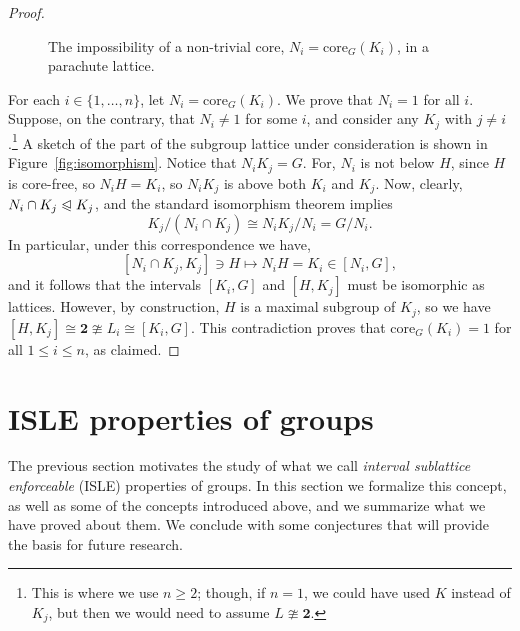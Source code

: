 \documentclass[cm,dissertation]{uhthesis}
\theoremstyle{plain}
\theoremstyle{definition}
\newcounter{claim}
\newcounter{conjecture}
\theoremstyle{remark}
\numberwithin{theorem}{section}
\numberwithin{claim}{chapter}
\numberwithin{equation}{section}
\numberwithin{conjecture}{chapter}
\newcommand{\<}{\ensuremath{\langle}}
\renewcommand{\>}{\ensuremath{\rangle}}
\renewcommand{\leq}{\ensuremath{\leqslant}}
\renewcommand{\geq}{\ensuremath{\geqslant}}
\newcommand{\subnormal}{\ensuremath{\trianglelefteqslant}}
\newcommand{\core}{\ensuremath{\mathrm{core}}}
\newcommand{\0}{\ensuremath{\mathbf{0}}}
\newcommand{\1}{\ensuremath{\mathbf{1}}}
\newcommand{\2}{\ensuremath{\mathbf{2}}}
\newcommand{\3}{\ensuremath{\mathbf{3}}}
\newcommand{\4}{\ensuremath{\mathbf{4}}}
\newcommand{\5}{\ensuremath{\mathbf{5}}}
\newcommand{\ISLE}{{\small ISLE}}
\newcommand{\two}{\ensuremath{\mathbf{2}}}
\begin{document}
\begin{proof}
\begin{figure}[!h]
\caption{The impossibility of a non-trivial core, $N_i = \core_G(K_i)$, in a parachute lattice.}
\end{figure}

For each $i\in\{1, \dots, n\}$, let $N_i = \core_G(K_i)$.  We prove that
$N_i=1$ for all $i$.  Suppose, on the contrary, that $N_i \neq 1$ for some
$i$, and consider any $K_j$ with $j\neq i$.\footnote{This is where we use $n\geq
  2$; though, if $n=1$, we could have used $K$ instead of $K_j$, but then we
  would need to assume $L\ncong \two$.}
A sketch of the part of the subgroup lattice under consideration is shown in
Figure~\ref{fig:isomorphism}. 
Notice that $N_i K_j = G$. For, $N_i$ is not below $H$, since
$H$ is core-free, so $N_i H = K_i$, so
$N_i K_j$ is above both $K_i$ and $K_j$.
Now, clearly,
$N_i\cap K_j\subnormal K_j$, and 
the standard isomorphism theorem implies
\[
K_j/(N_i\cap K_j)
\cong 
N_i K_j/N_i =
G/N_i.
\]
In particular, under this correspondence we have, 
\[
[N_i\cap K_j, K_j] \ni H \mapsto N_i H = K_i \in [N_i, G],
\]
and it follows that the intervals $[K_i, G]$ and $[H, K_j]$ must be isomorphic
as lattices.  However, by construction, 
$H$ is a maximal subgroup of $K_j$, so we have
$[H, K_j]\cong \two \ncong L_i  \cong [K_i, G]$.
This contradiction proves that $\core_G(K_i) = 1$ for all $1\leq i\leq n$, as claimed.
\end{proof}

\section{ISLE properties of groups}
\label{sec:isle-prop-groups}
The previous section motivates the study of what we call
\emph{interval sublattice enforceable} (\ISLE) properties of groups.  In this section we
formalize this concept, as well as some of the concepts introduced above, and we summarize
what we have proved about them.  We conclude with some conjectures that 
will provide the basis for future research.
\end{document}
